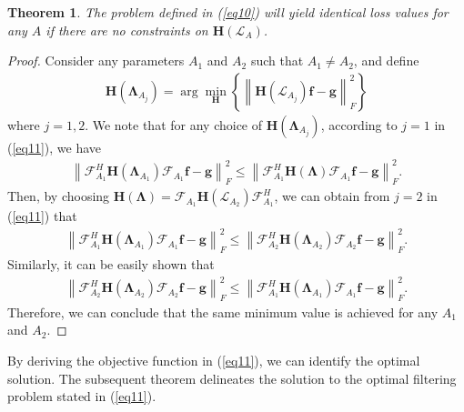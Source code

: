 \documentclass[lettersize,journal]{IEEEtran}
\newtheorem{thm}{Theorem}
\begin{document}
\begin{thm}
The problem defined in (\ref{eq10}) will yield identical loss values for any $A$ if there are no constraints on $\mathbf{H}(\mathcal{L}_{A})$.
\end{thm}
\begin{proof}
	Consider any parameters $A_1$ and $A_2$ such that $A_1 \neq A_2$, and define
	\begin{align} \label{eq11}
		\mathbf{H}(\boldsymbol{\Lambda}_{A_j})=\arg \min _{\mathbf{H}} \left\{\left\|\mathbf{H}(\mathcal{L}_{A_j}) \mathbf{f} - \mathbf{g}\right\|_F^2\right\} 
	\end{align}
	where $j=1,2$. 
	We note that for any choice of $\mathbf{H}(\boldsymbol{\Lambda}_{A_j})$, according to $j=1$ in (\ref{eq11}), we have
	\begin{align}
		\left\|\mathcal{F}_{A_1}^H \mathbf{H}(\boldsymbol{\Lambda}_{A_1}) \mathcal{F}_{A_1} \mathbf{f} - \mathbf{g}\right\|_F^2
		\leq
		\left\|\mathcal{F}_{A_1}^H \mathbf{H}(\boldsymbol{\Lambda}) \mathcal{F}_{A_1} \mathbf{f} - \mathbf{g}\right\|_F^2. \nonumber
	\end{align}
	Then, by choosing $\mathbf{H}(\boldsymbol{\Lambda})= \mathcal{F}_{A_1} \mathbf{H}(\mathcal{L}_{A_2}) \mathcal{F}_{A_1}^H$, we can obtain from $j=2$ in (\ref{eq11}) that
	\begin{align}
		\left\|\mathcal{F}_{A_1}^H \mathbf{H}(\boldsymbol{\Lambda}_{A_1}) \mathcal{F}_{A_1} \mathbf{f} - \mathbf{g}\right\|_F^2
		\leq
			\left\|\mathcal{F}_{A_2}^H \mathbf{H}(\boldsymbol{\Lambda}_{A_2}) \mathcal{F}_{A_2} \mathbf{f} - \mathbf{g}\right\|_F^2. \nonumber
	\end{align}
	Similarly, it can be easily shown that
	\begin{align}
		\left\|\mathcal{F}_{A_2}^H \mathbf{H}(\boldsymbol{\Lambda}_{A_2}) \mathcal{F}_{A_2} \mathbf{f} - \mathbf{g}\right\|_F^2
		\leq
		\left\|\mathcal{F}_{A_1}^H \mathbf{H}(\boldsymbol{\Lambda}_{A_1}) \mathcal{F}_{A_1} \mathbf{f} - \mathbf{g}\right\|_F^2. \nonumber
	\end{align}
Therefore, we can conclude that the same minimum value is achieved for any $A_1$ and $A_2$.
\end{proof}

By deriving the objective function in (\ref{eq11}), we can identify the optimal solution. The subsequent theorem delineates the solution to the optimal filtering problem stated in (\ref{eq11}).
\end{document}
